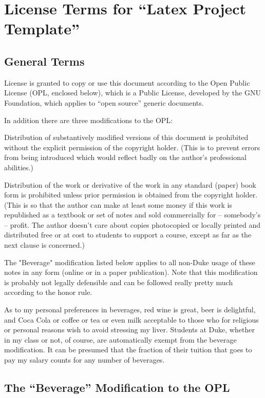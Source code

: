 \newpage
\appendix
\section{License Terms for ``Latex Project Template''}

\subsection{General Terms}

License is granted to copy or use this document according to the Open
Public License (OPL, enclosed below), which is a Public License,
developed by the GNU Foundation, which applies to ``open source''
generic documents.

In addition there are three modifications to the OPL:

Distribution of substantively modified versions of this document is
prohibited without the explicit permission of the copyright holder.
(This is to prevent errors from being introduced which would reflect
badly on the author's professional abilities.)

Distribution of the work or derivative of the work in any standard
(paper) book form is prohibited unless prior permission is obtained from
the copyright holder. (This is so that the author can make at least some
money if this work is republished as a textbook or set of notes and sold
commercially for -- somebody's -- profit.  The author doesn't care about
copies photocopied or locally printed and distributed free or at cost to
students to support a course, except as far as the next clause is
concerned.)

The "Beverage" modification listed below applies to all non-Duke usage
of these notes in any form (online or in a paper publication).  Note
that this modification is probably not legally defensible and can be
followed really pretty much according to the honor rule.

As to my personal preferences in beverages, red wine is great, beer is
delightful, and Coca Cola or coffee or tea or even milk acceptable to
those who for religious or personal reasons wish to avoid stressing my
liver.  Students at Duke, whether in my class or not, of course, are
automatically exempt from the beverage modification.  It can be presumed
that the fraction of their tuition that goes to pay my salary counts for
any number of beverages.

\bigskip

\subsection{The ``Beverage'' Modification to the OPL}


